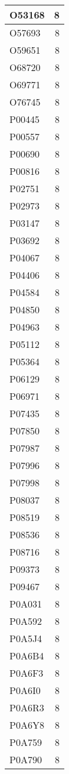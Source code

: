 \documentclass[
]{book}
\theoremstyle{definition}
\theoremstyle{definition}
\theoremstyle{definition}
\theoremstyle{definition}
\theoremstyle{remark}
\begin{document}
\begin{table}
\begin{tabular}{l|r}
\hline
O53168 & 8\\
\hline
O57693 & 8\\
\hline
O59651 & 8\\
\hline
O68720 & 8\\
\hline
O69771 & 8\\
\hline
O76745 & 8\\
\hline
P00445 & 8\\
\hline
P00557 & 8\\
\hline
P00690 & 8\\
\hline
P00816 & 8\\
\hline
P02751 & 8\\
\hline
P02973 & 8\\
\hline
P03147 & 8\\
\hline
P03692 & 8\\
\hline
P04067 & 8\\
\hline
P04406 & 8\\
\hline
P04584 & 8\\
\hline
P04850 & 8\\
\hline
P04963 & 8\\
\hline
P05112 & 8\\
\hline
P05364 & 8\\
\hline
P06129 & 8\\
\hline
P06971 & 8\\
\hline
P07435 & 8\\
\hline
P07850 & 8\\
\hline
P07987 & 8\\
\hline
P07996 & 8\\
\hline
P07998 & 8\\
\hline
P08037 & 8\\
\hline
P08519 & 8\\
\hline
P08536 & 8\\
\hline
P08716 & 8\\
\hline
P09373 & 8\\
\hline
P09467 & 8\\
\hline
P0A031 & 8\\
\hline
P0A592 & 8\\
\hline
P0A5J4 & 8\\
\hline
P0A6B4 & 8\\
\hline
P0A6F3 & 8\\
\hline
P0A6I0 & 8\\
\hline
P0A6R3 & 8\\
\hline
P0A6Y8 & 8\\
\hline
P0A759 & 8\\
\hline
P0A790 & 8\\

\end{tabular}
\end{table}
\end{document}
